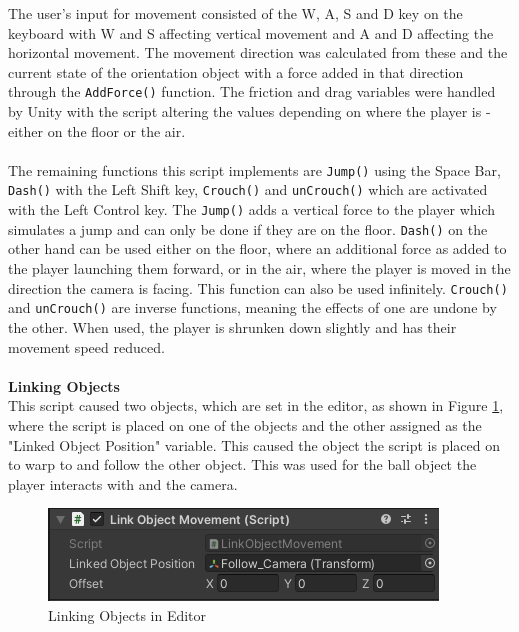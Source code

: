 \noindent The user's input for movement consisted of the W, A, S and D key on the keyboard with W and S affecting vertical movement and A and D affecting the horizontal movement. The movement direction was calculated from these and the current state of the orientation object with a force added in that direction through the \texttt{AddForce()} function. The friction and drag variables were handled by Unity with the script altering the values depending on where the player is - either on the floor or the air. 
\\\\
The remaining functions this script implements are \texttt{Jump()} using the Space Bar, \texttt{Dash()} with the Left Shift key, \texttt{Crouch()} and \texttt{unCrouch()} which are activated with the Left Control key. The \texttt{Jump()} adds a vertical force to the player which simulates a jump and can only be done if they are on the floor. \texttt{Dash()} on the other hand can be used either on the floor, where an additional force as added to the player launching them forward, or in the air, where the player is moved in the direction the camera is facing. This function can also be used infinitely. \texttt{Crouch()} and \texttt{unCrouch()} are inverse functions, meaning the effects of one are undone by the other. When used, the player is shrunken down slightly and has their movement speed reduced.
\\\\
\textbf{Linking Objects}\\
This script caused two objects, which are set in the editor, as shown in Figure \ref{link}, where the script is placed on one of the objects and the other assigned as the "Linked Object Position" variable. This caused the object the script is placed on to warp to and follow the other object. This was used for the ball object the player interacts with and the camera.

\begin{figure}[H]
\centering
\includegraphics[scale=1]{Figures/link.png}
\caption{Linking Objects in Editor}
\label{link}
\end{figure}


